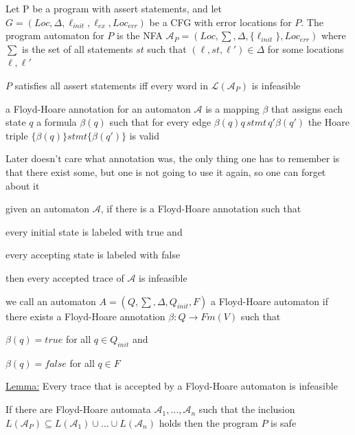 \documentclass[landscape, a4paper]{article}
\begin{document}
\begin{minipage}[t]{0.2\linewidth}
\begin{betterlist}
\begin{betterlist}
		\end{betterlist}
		\item Let P be a program with assert statements, and let $G = (Loc, \Delta , \ell_{init}, \ell_{ex}, Loc_{err})$ be a CFG with error locations for $P$. \color{orange}The \alert{program automaton} for $P$ is the NFA $\mathcal{A}_P = (Loc, \sum , \Delta , \{ \ell_{init}\} , Loc_{err})$ where $\sum$ is the set of all statements $st$ such that $(\ell, st, \ell') \in \Delta$ for some locations $\ell, \ell'$\color{black}
		\begin{betterlist}
			\item $P$ satisfies all assert statements iff every word in $\mathcal{L}(\mathcal{A}_P)$ is infeasible
		\end{betterlist}
		\item \color{orange}a \alert{Floyd-Hoare annotation} for an automaton $\mathcal{A}$ is a mapping $\beta$ that assigns each state $q$ a formula $\beta(q)$ such that for every edge $\beta (q)q\, stmt\, q'\beta(q')$ the Hoare triple $\{\beta(q)\} stmt \{\beta(q′)\}$ is valid\color{black}
		\begin{betterlist}
			\item Later doesn't care what annotation was, the only thing one has to remember is that there exist some, but one is not going to use it again, so one can forget about it
		\end{betterlist}

		\item \color{violet}given an automaton $\mathcal{A}$, if there is a Floyd-Hoare annotation such that
		\begin{betterlist}
			\item every initial state is labeled with true and
			\item every accepting state is labeled with false
		\end{betterlist}
		then every accepted trace of $\mathcal{A}$ is infeasible\color{black}
		\item \color{orange}we call an automaton $A = (Q, \sum , \Delta , Q_{init}, F)$ a \alert{Floyd-Hoare automaton} if there exists a Floyd-Hoare annotation $\beta  : Q \rightarrow Fm(V)$ such that
		\begin{betterlist}
			\item $\beta(q) = true$ for all $q \in Q_{init}$ and
			\item $\beta(q) = false$ for all $q \in F$
		\end{betterlist}\color{black}
		\item \underline{Lemma:} Every trace that is accepted by a Floyd-Hoare automaton is infeasible
		\item If there are Floyd-Hoare automata $\mathcal{A}_{1}, \ldots, \mathcal{A}_{n}$ such that the inclusion $L(\mathcal{A}_P) \subseteq L(\mathcal{A}_{1}) \cup . . . \cup L(\mathcal{A}_{n})$ holds then the program $P$ is safe
	\end{betterlist}


\end{minipage}
\end{document}
